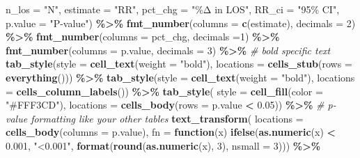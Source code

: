\documentclass[
]{article}
\newenvironment{Shaded}{\begin{snugshade}}{\end{snugshade}}
\newcommand{\AttributeTok}[1]{\textcolor[rgb]{0.13,0.29,0.53}{#1}}
\newcommand{\CommentTok}[1]{\textcolor[rgb]{0.56,0.35,0.01}{\textit{#1}}}
\newcommand{\ControlFlowTok}[1]{\textcolor[rgb]{0.13,0.29,0.53}{\textbf{#1}}}
\newcommand{\DecValTok}[1]{\textcolor[rgb]{0.00,0.00,0.81}{#1}}
\newcommand{\FloatTok}[1]{\textcolor[rgb]{0.00,0.00,0.81}{#1}}
\newcommand{\FunctionTok}[1]{\textcolor[rgb]{0.13,0.29,0.53}{\textbf{#1}}}
\newcommand{\NormalTok}[1]{#1}
\newcommand{\SpecialCharTok}[1]{\textcolor[rgb]{0.81,0.36,0.00}{\textbf{#1}}}
\newcommand{\StringTok}[1]{\textcolor[rgb]{0.31,0.60,0.02}{#1}}
\begin{document}
\begin{Shaded}
\begin{Highlighting}[]
    \AttributeTok{n\_los =} \StringTok{"N"}\NormalTok{, }
    \AttributeTok{estimate =} \StringTok{"RR"}\NormalTok{,}
    \AttributeTok{pct\_chg =} \StringTok{"\%Δ in LOS"}\NormalTok{,}
    \AttributeTok{RR\_ci =} \StringTok{"95\% CI"}\NormalTok{,}
    \AttributeTok{p.value  =} \StringTok{"P{-}value"}\NormalTok{) }\SpecialCharTok{\%\textgreater{}\%}
  \FunctionTok{fmt\_number}\NormalTok{(}\AttributeTok{columns =} \FunctionTok{c}\NormalTok{(estimate), }\AttributeTok{decimals =} \DecValTok{2}\NormalTok{) }\SpecialCharTok{\%\textgreater{}\%}
  \FunctionTok{fmt\_number}\NormalTok{(}\AttributeTok{columns =}\NormalTok{ pct\_chg, }\AttributeTok{decimals =}\DecValTok{1}\NormalTok{) }\SpecialCharTok{\%\textgreater{}\%} 
  \FunctionTok{fmt\_number}\NormalTok{(}\AttributeTok{columns =}\NormalTok{ p.value, }\AttributeTok{decimals =} \DecValTok{3}\NormalTok{) }\SpecialCharTok{\%\textgreater{}\%}
    \CommentTok{\# bold specific text}
  \FunctionTok{tab\_style}\NormalTok{(}\AttributeTok{style =} \FunctionTok{cell\_text}\NormalTok{(}\AttributeTok{weight =} \StringTok{"bold"}\NormalTok{),}
    \AttributeTok{locations =} \FunctionTok{cells\_stub}\NormalTok{(}\AttributeTok{rows =} \FunctionTok{everything}\NormalTok{())) }\SpecialCharTok{\%\textgreater{}\%}
  \FunctionTok{tab\_style}\NormalTok{(}\AttributeTok{style =} \FunctionTok{cell\_text}\NormalTok{(}\AttributeTok{weight =} \StringTok{"bold"}\NormalTok{),}
    \AttributeTok{locations =} \FunctionTok{cells\_column\_labels}\NormalTok{()) }\SpecialCharTok{\%\textgreater{}\%}
  \FunctionTok{tab\_style}\NormalTok{(}
  \AttributeTok{style =} \FunctionTok{cell\_fill}\NormalTok{(}\AttributeTok{color =} \StringTok{"\#FFF3CD"}\NormalTok{),}
  \AttributeTok{locations =} \FunctionTok{cells\_body}\NormalTok{(}\AttributeTok{rows =}\NormalTok{ p.value }\SpecialCharTok{\textless{}} \FloatTok{0.05}\NormalTok{)) }\SpecialCharTok{\%\textgreater{}\%} 
  \CommentTok{\# p{-}value formatting like your other tables}
  \FunctionTok{text\_transform}\NormalTok{(}
    \AttributeTok{locations =} \FunctionTok{cells\_body}\NormalTok{(}\AttributeTok{columns =}\NormalTok{ p.value),}
    \AttributeTok{fn =} \ControlFlowTok{function}\NormalTok{(x) }\FunctionTok{ifelse}\NormalTok{(}\FunctionTok{as.numeric}\NormalTok{(x) }\SpecialCharTok{\textless{}} \FloatTok{0.001}\NormalTok{, }\StringTok{"\textless{}0.001"}\NormalTok{,}
                            \FunctionTok{format}\NormalTok{(}\FunctionTok{round}\NormalTok{(}\FunctionTok{as.numeric}\NormalTok{(x), }\DecValTok{3}\NormalTok{), }\AttributeTok{nsmall =} \DecValTok{3}\NormalTok{))) }\SpecialCharTok{\%\textgreater{}\%}

\end{Highlighting}
\end{Shaded}
\end{document}
